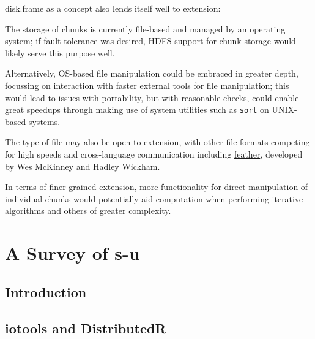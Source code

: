 \documentclass[a4paper,10pt]{article}
\begin{document}
disk.frame as a concept also lends itself well to extension:

The storage of chunks is currently file-based and managed by an
operating system; if fault tolerance was desired, HDFS support for
chunk storage would likely serve this purpose well.

Alternatively, OS-based file manipulation could be embraced in greater
depth, focussing on interaction with faster external tools for file
manipulation; this would lead to issues with portability, but with
reasonable checks, could enable great speedups through making use of
system utilities such as \texttt{sort} on UNIX-based systems.

The type of file may also be open to extension, with other file
formats competing for high speeds and cross-language communication
including \href{https://github.com/wesm/feather}{feather}, developed
by Wes McKinney and Hadley Wickham\cite{wes16}.

In terms of finer-grained extension, more functionality for direct
manipulation of individual chunks would potentially aid computation
when performing iterative algorithms and others of greater complexity.

\section{A Survey of s-u}

\subsection{Introduction}


\subsection{iotools and DistributedR}
\end{document}
